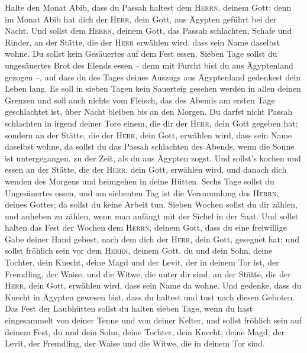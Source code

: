  Halte den Monat Abib, dass du Passah haltest dem
\textsc{Herrn}, deinem Gott; denn im Monat Abib hat dich der
\textsc{Herr}, dein Gott, aus Ägypten geführt bei der Nacht.
 Und sollst dem \textsc{Herrn}, deinem Gott, das Passah
schlachten, Schafe und Rinder, an der Stätte, die der \textsc{Herr}
erwählen wird, dass sein Name daselbst wohne.  Du sollst
kein Gesäuertes auf dem Fest essen. Sieben Tage sollst du ungesäuertes
Brot des Elends essen -- denn mit Furcht bist du aus Ägyptenland gezogen
--, auf dass du des Tages deines Auszugs aus Ägyptenland gedenkest dein
Leben lang.  Es soll in sieben Tagen kein Sauerteig
gesehen werden in allen deinen Grenzen und soll auch nichts vom Fleisch,
das des Abends am ersten Tage geschlachtet ist, über Nacht bleiben bis
an den Morgen.  Du darfst nicht Passah schlachten in
irgend deiner Tore einem, die dir der \textsc{Herr}, dein Gott gegeben
hat;  sondern an der Stätte, die der \textsc{Herr}, dein
Gott, erwählen wird, dass sein Name daselbst wohne, da sollst du das
Passah schlachten des Abends, wenn die Sonne ist untergegangen, zu der
Zeit, als du aus Ägypten zogst.  Und sollst's kochen und
essen an der Stätte, die der \textsc{Herr}, dein Gott, erwählen wird,
und danach dich wenden des Morgens und heimgehen in deine Hütten.
 Sechs Tage sollst du Ungesäuertes essen, und am siebenten
Tag ist die Versammlung des \textsc{Herrn}, deines Gottes; da sollst du
keine Arbeit tun.  Sieben Wochen sollst du dir zählen, und
anheben zu zählen, wenn man anfängt mit der Sichel in der Saat.
 Und sollst halten das Fest der Wochen dem
\textsc{Herrn}, deinem Gott, dass du eine freiwillige Gabe deiner Hand
gebest, nach dem dich der \textsc{Herr}, dein Gott, gesegnet hat;
 und sollst fröhlich sein vor dem \textsc{Herrn}, deinem
Gott, du und dein Sohn, deine Tochter, dein Knecht, deine Magd und der
Levit, der in deinem Tor ist, der Fremdling, der Waise, und die Witwe,
die unter dir sind, an der Stätte, die der \textsc{Herr}, dein Gott,
erwählen wird, dass sein Name da wohne.  Und gedenke,
dass du Knecht in Ägypten gewesen bist, dass du haltest und tust nach
diesen Geboten.  Das Fest der Laubhütten sollst du halten
sieben Tage, wenn du hast eingesammelt von deiner Tenne und von deiner
Kelter,  und sollst fröhlich sein auf deinem Fest, du und
dein Sohn, deine Tochter, dein Knecht, deine Magd, der Levit, der
Fremdling, der Waise und die Witwe, die in deinem Tor sind.
